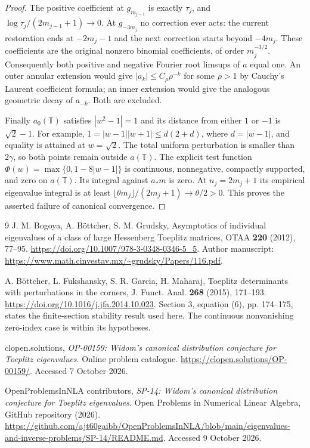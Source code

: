 \documentclass[11pt]{article}
\newcommand{\T}{\mathbb T}
\begin{document}
\begin{proof}
The positive coefficient at $g_{m_{j-1}}$ is exactly $\tau_j$,
and $\log\tau_j/(2m_{j-1}+1)\to0$. At $g_{-3m_j}$ no
correction ever acts: the current restoration ends at
$-2m_j-1$ and the next correction starts beyond $-4m_j$.
These coefficients are the original nonzero binomial coefficients,
of order $m_j^{-3/2}$. Consequently both positive and negative
Fourier root limsups of $a$ equal one. An outer annular extension
would give $|a_k|\le C_\rho\rho^{-k}$ for some $\rho>1$ by
Cauchy's Laurent coefficient formula; an inner extension would
give the analogous geometric decay of $a_{-k}$. Both are excluded.

Finally $a_0(\T)$ satisfies $|w^2-1|=1$ and its distance from
either $1$ or $-1$ is $\sqrt2-1$. For example,
$1=|w-1||w+1|\le d(2+d)$, where $d=|w-1|$,
and equality is attained at $w=\sqrt2$.
The total uniform perturbation is smaller than $2\gamma$, so
both points remain outside $a(\T)$. The explicit test function
$\Phi(w)=\max\{0,1-8|w-1|\}$ is continuous, nonnegative,
compactly supported, and zero on $a(\T)$.
Its integral against $a_*m$ is zero. At $n_j=2m_j+1$ its empirical eigenvalue
integral is at least
$\lfloor\theta m_j\rfloor/(2m_j+1)\to\theta/2>0$.
This proves the asserted failure of canonical convergence.
\end{proof}

\begin{thebibliography}{9}
 J. M. Bogoya, A. B\"ottcher, S. M. Grudsky,
Asymptotics of individual eigenvalues of a class of large Hessenberg
Toeplitz matrices, OTAA \textbf{220} (2012), 77--95.
\url{https://doi.org/10.1007/978-3-0348-0346-5_5}.
Author manuscript: \url{https://www.math.cinvestav.mx/~grudsky/Papers/116.pdf}.

 A. B\"ottcher, L. Fukshansky, S. R. Garcia, H. Maharaj,
Toeplitz determinants with perturbations in the corners,
J. Funct. Anal. \textbf{268} (2015), 171--193.
\url{https://doi.org/10.1016/j.jfa.2014.10.023}.
Section 3, equation (6), pp. 174--175, states the finite-section
stability result used here. The continuous nonvanishing
zero-index case is within its hypotheses.

 clopen.solutions,
\emph{OP-00159: Widom's canonical distribution conjecture for Toeplitz
eigenvalues}. Online problem catalogue.
\url{https://clopen.solutions/OP-00159/}.
Accessed 7 October 2026.

 OpenProblemsInNLA contributors,
\emph{SP-14: Widom's canonical distribution conjecture for Toeplitz
eigenvalues}. Open Problems in Numerical Linear Algebra,
GitHub repository (2026).
\url{https://github.com/ajt60gaibb/OpenProblemsInNLA/blob/main/eigenvalues-and-inverse-problems/SP-14/README.md}.
Accessed 9 October 2026.
\end{thebibliography}
\end{document}
